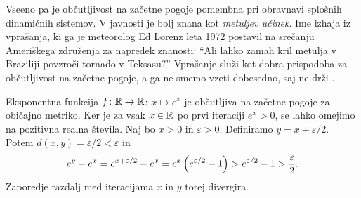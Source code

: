 \noindent Vseeno pa je občutljivost na začetne pogoje pomembna pri obravnavi splošnih dinamičnih sistemov. V javnosti je bolj znana kot \emph{metuljev učinek}. Ime izhaja iz vprašanja, ki ga je meteorolog Ed Lorenz leta \num{1972} postavil na srečanju Ameriškega združenja za napredek znanosti: ``Ali lahko zamah kril metulja v Braziliji povzroči tornado v Teksasu?'' Vprašanje služi kot dobra prispodoba za občutljivost na začetne pogoje, a ga ne smemo vzeti dobesedno, saj ne drži \cite{Pielke_2024}.

\begin{primer}
    Eksponentna funkcija \(f \colon \mathbb R \to \mathbb R\); \(x \mapsto e^x\) je občutljiva na začetne pogoje za običajno metriko. Ker je za vsak \(x \in \mathbb R\) po prvi iteraciji \(e^x > 0\), se lahko omejimo na pozitivna realna števila. Naj bo \(x > 0\) in \(\varepsilon > 0\). Definiramo \(y = x + \varepsilon / 2\). Potem \(d (x, y) = \varepsilon / 2 < \varepsilon\) in
    \[e^{y} - e^{x} = e^{x + \varepsilon / 2} - e^x = e^x \left( e^{\varepsilon / 2} - 1 \right) > e^{\varepsilon / 2} - 1 > \frac{\varepsilon}{2}.\]
    Zaporedje razdalj med iteracijama \(x\) in \(y\) torej divergira.
\end{primer}




